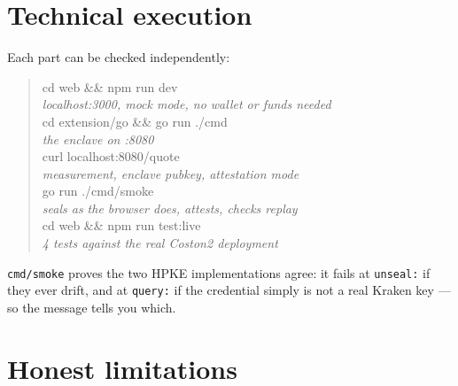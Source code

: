 \documentclass[11pt,a4paper]{article}
\newcommand{\code}[1]{\texttt{\small #1}}
\newcommand{\TestsLive}{4}
\begin{document}
\section{Technical execution}

Each part can be checked independently:

\begin{quote}
\ttfamily\small
cd web \&\& npm run dev\\
\hspace*{2em}\textrm{\itshape localhost:3000, mock mode, no wallet or funds needed}\\[0.3em]
cd extension/go \&\& go run ./cmd\\
\hspace*{2em}\textrm{\itshape the enclave on :8080}\\[0.3em]
curl localhost:8080/quote\\
\hspace*{2em}\textrm{\itshape measurement, enclave pubkey, attestation mode}\\[0.3em]
go run ./cmd/smoke\\
\hspace*{2em}\textrm{\itshape seals as the browser does, attests, checks replay}\\[0.3em]
cd web \&\& npm run test:live\\
\hspace*{2em}\textrm{\itshape \TestsLive{} tests against the real Coston2 deployment}
\end{quote}

\code{cmd/smoke} proves the two HPKE implementations agree: it fails at
\code{unseal:} if they ever drift, and at \code{query:} if the credential
simply is not a real Kraken key --- so the message tells you which.

\section{Honest limitations}
\end{document}
